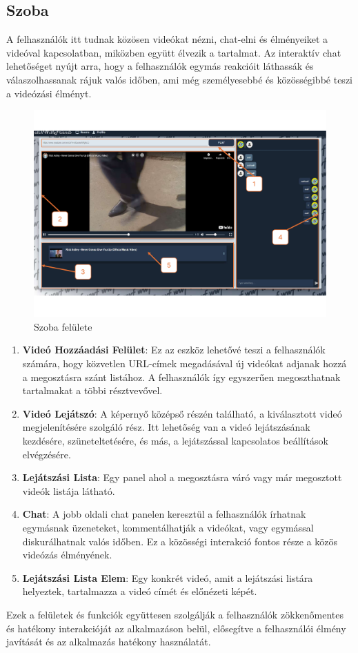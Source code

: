 \subsection{Szoba}
A felhasználók itt tudnak közösen videókat nézni, chat-elni és élményeiket a videóval kapcsolatban, miközben együtt élvezik a tartalmat. Az interaktív chat lehetőséget nyújt arra, hogy a felhasználók egymás reakcióit láthassák és válaszolhassanak rájuk valós időben, ami még személyesebbé és közösségibbé teszi a videózási élményt.
\begin{figure}[H]
    \centering
    \includegraphics[width=14.0truecm]{images/room.pdf}
    \caption{Szoba felülete}
    \label{fig:login}
\end{figure}
\begin{enumerate}[label=\textbf{\arabic*.}]
    \item \textbf{Videó Hozzáadási Felület}: Ez az eszköz lehetővé teszi a felhasználók számára, hogy közvetlen URL-címek megadásával új videókat adjanak hozzá a megosztásra szánt listához. A felhasználók így egyszerűen megoszthatnak tartalmakat a többi résztvevővel.
    
    \item \textbf{Videó Lejátszó}: A képernyő középső részén található, a kiválasztott videó megjelenítésére szolgáló rész. Itt lehetőség van a videó lejátszásának kezdésére, szüneteltetésére, és más, a lejátszással kapcsolatos beállítások elvégzésére.
    
    \item \textbf{Lejátszási Lista}: Egy panel ahol a megosztásra váró vagy már megosztott videók listája látható. 
    
    \item \textbf{Chat}: A jobb oldali chat panelen keresztül a felhasználók írhatnak egymásnak üzeneteket, kommentálhatják a videókat, vagy egymással diskurálhatnak valós időben. Ez a közösségi interakció fontos része a közös videózás élményének.
    
    \item \textbf{Lejátszási Lista Elem}: Egy konkrét videó, amit a lejátszási listára helyeztek, tartalmazza a videó címét és előnézeti képét. 
\end{enumerate}


Ezek a felületek és funkciók együttesen szolgálják a felhasználók zökkenőmentes és hatékony interakcióját az alkalmazáson belül, elősegítve a felhasználói élmény javítását és az alkalmazás hatékony használatát.